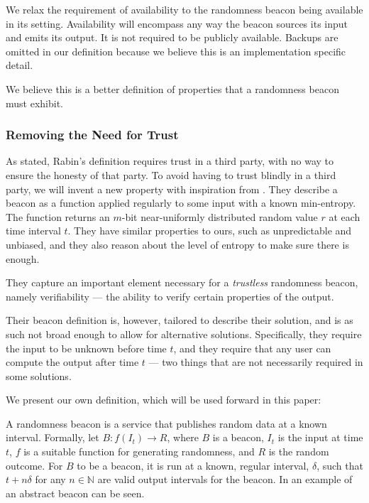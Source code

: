 We relax the requirement of availability to the randomness beacon being available in its setting. Availability will encompass any way the beacon sources its input and emits its output. It is not required to be publicly available. Backups are omitted in our definition because we believe this is an implementation specific detail.

We believe this is a better definition of properties that a randomness beacon must exhibit.

\subsubsection{Removing the Need for Trust}
As stated, Rabin's definition requires trust in a third party, with no way to ensure the honesty of that party.
To avoid having to trust blindly in a third party, we will invent a new property with inspiration from \citet{bonneau2015bitcoin}.
They describe a beacon as a function applied regularly to some input with a known min-entropy. The function returns an $m$-bit near-uniformly distributed random value $r$ at each time interval $t$. They have similar properties to ours, such as unpredictable and unbiased, and they also reason about the level of entropy to make sure there is enough.

They capture an important element necessary for a \emph{trustless} randomness beacon, namely verifiability --- the ability to verify certain properties of the output.

Their beacon definition is, however, tailored to describe their solution, and is as such not broad enough to allow for alternative solutions.
Specifically, they require the input to be unknown before time $t$, and they require that any user can compute the output after time $t$ --- two things that are not necessarily required in some solutions.

We present our own definition, which will be used forward in this paper:

A randomness beacon is a service that publishes random data at a known interval.
Formally, let $B: f(I_t) \rightarrow R$, where $B$ is a beacon, $I_t$ is the input at time $t$, $f$ is a suitable function for generating randomness, and $R$ is the random outcome. %
For $B$ to be a beacon, it is run at a known, regular interval, $\delta$, such that $t+n\delta$ for any $n \in \mathbb{N}$ are valid output intervals for the beacon.
In  an example of an abstract beacon can be seen.

